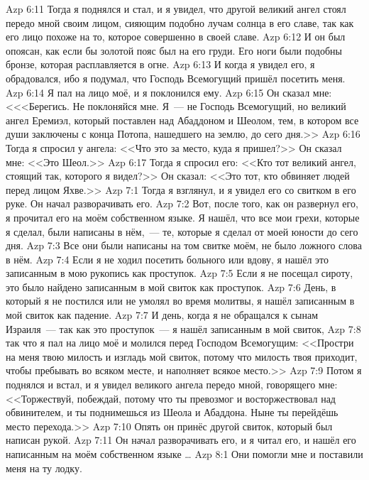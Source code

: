 \vs Azp 6:11
Тогда я поднялся и стал, и я увидел,
что другой великий ангел стоял передо мной своим лицом,
сияющим подобно лучам солнца в его славе,
так как его лицо похоже на то,
которое совершенно в своей славе.
\vs Azp 6:12
И он был опоясан, как если бы золотой пояс был на его груди.
Его ноги были подобны бронзе, которая расплавляется в огне.
\vs Azp 6:13
И когда я увидел его, я обрадовался, ибо я подумал,
что Господь Всемогущий пришёл посетить меня.
\vs Azp 6:14
Я пал на лицо моё, и я поклонился ему.
\vs Azp 6:15
Он сказал мне:
<<<Берегись. Не поклоняйся мне.
Я~--- не Господь Всемогущий, но великий ангел Еремиэл,
который поставлен над Абаддоном и Шеолом, тем,
в котором все души заключены с конца Потопа,
нашедшего на землю, до сего дня.>>
\vs Azp 6:16
Тогда я спросил у ангела:
<<Что это за место, куда я пришел?>>
Он сказал мне:
<<Это Шеол.>>
\vs Azp 6:17
Тогда я спросил его:
<<Кто тот великий ангел, стоящий так, которого я видел?>>
Он сказал:
<<Это тот, кто обвиняет людей перед лицом Яхве.>>
\vs Azp 7:1
Тогда я взглянул, и я увидел его со свитком в его руке.
Он начал разворачивать его.
\vs Azp 7:2
Вот, после того, как он развернул его,
я прочитал его на моём собственном языке.
Я нашёл, что все мои грехи, которые я сделал,
были написаны в нём,~--- те,
которые я сделал от моей юности до сего дня.
\vs Azp 7:3
Все они были написаны на том свитке моём,
не было ложного слова в нём.
\vs Azp 7:4
Если я не ходил посетить больного или вдову,
я нашёл это записанным в мою рукопись как проступок.
\vs Azp 7:5
Если я не посещал сироту, это было найдено записанным
в мой свиток как проступок.
\vs Azp 7:6
День, в который я не постился или не умолял во время молитвы,
я нашёл записанным в мой свиток как падение.
\vs Azp 7:7
И день, когда я не обращался
к сынам Израиля~--- так как это проступок~--- я нашёл
записанным в мой свиток,
\vs Azp 7:8
так что я пал на лицо моё и молился перед Господом Всемогущим:
<<Простри на меня твою милость и изгладь мой свиток,
потому что милость твоя приходит, чтобы пребывать
во всяком месте, и наполняет всякое место.>>
\vs Azp 7:9
Потом я поднялся и встал,
и я увидел великого ангела передо мной,
говорящего мне:
<<Торжествуй, побеждай, потому что ты превозмог
и восторжествовал над обвинителем,
и ты поднимешься из Шеола и Абаддона.
Ныне ты перейдёшь место перехода.>>
\vs Azp 7:10
Опять он принёс другой свиток,
который был написан рукой.
\vs Azp 7:11
Он начал разворачивать его,
и я читал его,
и нашёл его написанным на моём собственном языке \ldots
{}
\vs Azp 8:1
Они помогли мне и поставили меня на ту лодку.
